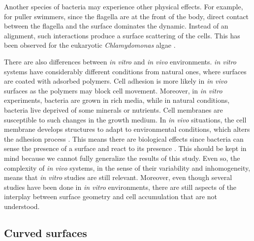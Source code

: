 Another species of bacteria may experience other physical effects. For example, for puller swimmers, since the flagella are at the front of the body, direct contact between the flagella and the surface dominates the dynamic. Instead of an alignment, such interactions produce a surface scattering of the cells. This has been observed for the eukaryotic \textit{Chlamydomonas} algae \cite{Kantsler2013CiliaryEukaryotes}. 

There are also differences between \textit{in vitro} and \textit{in vivo} environments. \textit{in vitro} systems have considerably different conditions from natural ones, where surfaces are coated with adsorbed polymers. Cell adhesion is more likely in \textit{in vivo} surfaces as the polymers may block cell movement. Moreover, in \textit{in vitro} experiments, bacteria are grown in rich media, while in natural conditions, bacteria live deprived of some minerals or nutrients. Cell membranes are susceptible to such changes in the growth medium. In \textit{in vivo} situations, the cell membrane develops structures to adapt to environmental conditions, which alters the adhesion process \cite{Brown1985TheInfections.}. This means there are biological effects since bacteria can sense the presence of a surface and react to its presence \cite{Kimkes2019HowContact,Laventie2020SurfaceBacteria}. This should be kept in mind because we cannot fully generalize the results of this study. Even so, the complexity of \textit{in vivo} systems, in the sense of their variability and inhomogeneity, means that \textit{in vitro} studies are still relevant. Moreover, even though several studies have been done in \textit{in vitro} environments, there are still aspects of the interplay between surface geometry and cell accumulation that are not understood.

\subsection{Curved surfaces}


